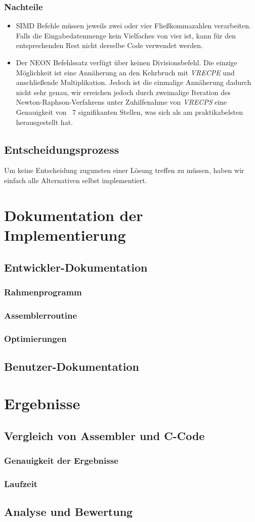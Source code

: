 \documentclass[11pt]{scrartcl}
\begin{document}
\subsubsection{Nachteile}
\begin{itemize}
\item SIMD Befehle müssen jeweils zwei oder vier Fließkommazahlen verarbeiten. Falls die Eingabedatenmenge kein Vielfaches von vier ist, kann für den entsprechenden Rest nicht derselbe Code verwendet werden.
\item Der NEON Befehlssatz verfügt über keinen Divisionsbefehl. Die einzige Möglichkeit ist eine Annäherung an den Kehrbruch mit \emph{VRECPE} und anschließende Multiplikation. 
Jedoch ist die einmalige Annäherung dadurch nicht sehr genau, wir erreichen jedoch durch zweimalige Iteration des Newton-Raphson-Verfahrens unter Zuhilfenahme von \emph{VRECPS} eine Genauigkeit von ~7 signifikanten Stellen, was sich als am praktikabelsten herausgestellt hat. 
\end{itemize}
\subsection{Entscheidungsprozess}
Um keine Entscheidung zugunsten einer Lösung treffen zu müssen, haben wir einfach alle Alternativen selbst implementiert.
\section{Dokumentation der Implementierung}
\subsection{Entwickler-Dokumentation}
\subsubsection{Rahmenprogramm}
\subsubsection{Assemblerroutine}
\subsubsection{Optimierungen}
\subsection{Benutzer-Dokumentation}

\section{Ergebnisse}
\subsection{Vergleich von Assembler und C-Code}
\subsubsection{Genauigkeit der Ergebnisse}
\subsubsection{Laufzeit}
\subsection{Analyse und Bewertung}
\end{document}
